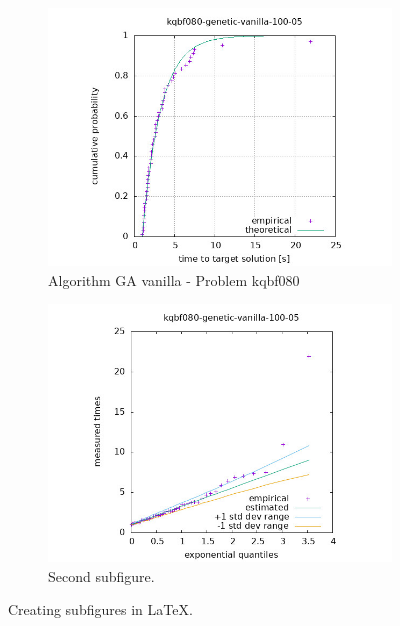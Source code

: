 \begin{figure}[H]
    \centering
    \begin{subfigure}{0.49\textwidth}
        \includegraphics[width=\textwidth]{figure/ttt_plot/kqbf080-genetic-vanilla-100-05-exp.jpeg}
        \caption{Algorithm GA vanilla - Problem kqbf080}
        \label{fig:ga-vanilla-kqbf080-exp}
    \end{subfigure}
    \hfill
    \begin{subfigure}{0.49\textwidth}
        \includegraphics[width=\textwidth]{figure/ttt_plot/kqbf080-genetic-vanilla-100-05-qq.jpeg}
        \caption{Second subfigure.}
        \label{fig:ga-vanilla-kqbf080-qq}
    \end{subfigure}
    \caption{Creating subfigures in \LaTeX.}
    \label{fig:ga-vanilla-kqbf080}
\end{figure}


